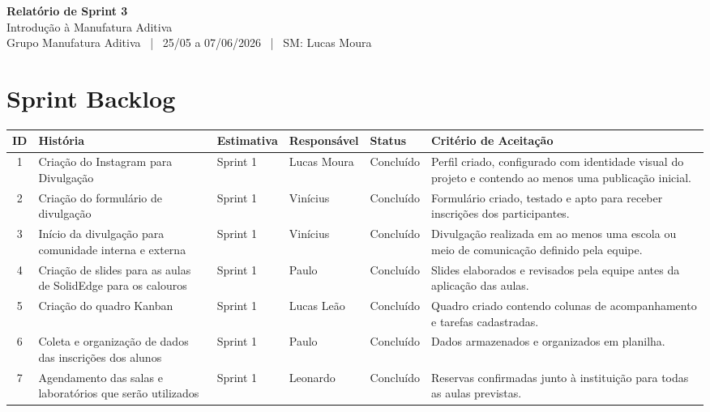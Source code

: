 \documentclass[12pt,a4paper]{article}
\newcommand{\projetotitulo}{Introdução à Manufatura Aditiva}
\newcommand{\grupoid}{Grupo Manufatura Aditiva}
\newcommand{\sprintnum}{3}
\newcommand{\sprintperiodo}{25/05 a 07/06/2026}
\newcommand{\scrummaster}{Lucas Moura}
\begin{document}
\begin{center}
{\Large\bfseries Relatório de Sprint \sprintnum}\\
{\large \projetotitulo}\\
\grupoid{} \ | \ \sprintperiodo{} \ | \ SM: \scrummaster
\end{center}

\section{Sprint Backlog}

\begin{longtable}{|c|p{3.8cm}|p{1.9cm}|p{2.2cm}|p{1.7cm}|p{4.2cm}|}
\toprule
ID & História & Estimativa & Responsável & Status & Critério de Aceitação \\
\midrule
1 & Criação do Instagram para Divulgação & Sprint 1 & Lucas Moura & Concluído & Perfil criado, configurado com identidade visual do projeto e contendo ao menos uma publicação inicial. \\ \hline

2 & Criação do formulário de divulgação & Sprint 1 & Vinícius & Concluído & Formulário criado, testado e apto para receber inscrições dos participantes. \\ \hline

3 & Início da divulgação para comunidade interna e externa & Sprint 1 & Vinícius & Concluído & Divulgação realizada em ao menos uma escola ou meio de comunicação definido pela equipe. \\ \hline

4 & Criação de slides para as aulas de SolidEdge para os calouros & Sprint 1 & Paulo & Concluído & Slides elaborados e revisados pela equipe antes da aplicação das aulas. \\ \hline

5 & Criação do quadro Kanban & Sprint 1 & Lucas Leão & Concluído & Quadro criado contendo colunas de acompanhamento e tarefas cadastradas. \\ \hline

6 & Coleta e organização de dados das inscrições dos alunos & Sprint 1 & Paulo & Concluído & Dados armazenados e organizados em planilha. \\ \hline

7 & Agendamento das salas e laboratórios que serão utilizados & Sprint 1 & Leonardo & Concluído & Reservas confirmadas junto à instituição para todas as aulas previstas. \\ \hline


\end{longtable}
\end{document}
